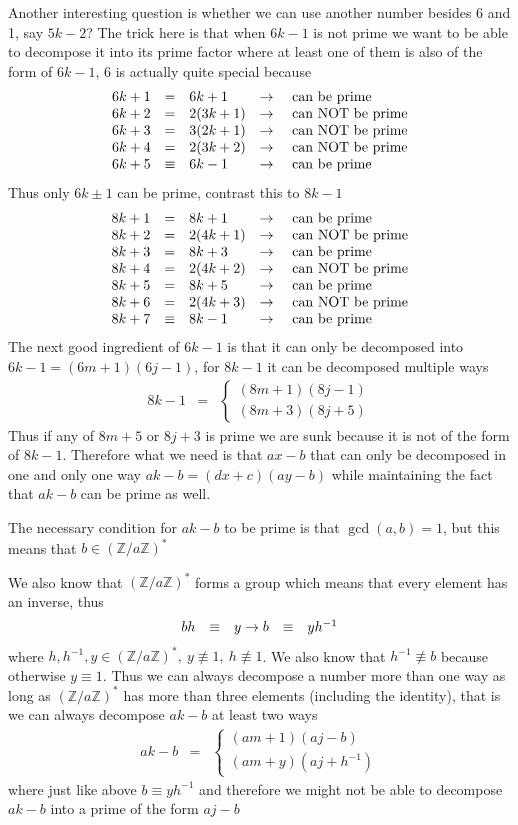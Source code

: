 \documentclass[aps,preprint,preprintnumbers,nofootinbib,showpacs,prd]{revtex4-1}
\newcommand{\ba}{\begin{array}}
\newcommand{\ea}{\end{array}}
\newcommand{\nbea}{\begin{eqnarray*}}
\newcommand{\neea}{\end{eqnarray*}}
\begin{document}
Another interesting question is whether we can use another number besides 6 and 1, say $5k - 2$? The trick here is that when $6k-1$ is not prime we want to be able to decompose it into its prime factor where at least one of them is also of the form of $6k - 1$, 6 is actually quite special because
%
\nbea
\ba{r c l c l}
6k + 1 & = & 6k + 1 & \to & {\rm~can~be~prime} \\
6k + 2 & = & 2(3k + 1) & \to & {\rm~can~NOT~be~prime} \\
6k + 3 & = & 3(2k + 1) & \to & {\rm~can~NOT~be~prime} \\
6k + 4 & = & 2(3k + 2) & \to & {\rm~can~NOT~be~prime} \\
6k + 5 & \equiv & 6k - 1 & \to & {\rm~can~be~prime}
\ea
\neea
%
Thus only $6k \pm 1$ can be prime, contrast this to $8k - 1$
%
\nbea
\ba{r c l c l}
8k + 1 & = & 8k + 1 & \to & {\rm~can~be~prime} \\
8k + 2 & = & 2(4k + 1) & \to & {\rm~can~NOT~be~prime} \\
8k + 3 & = & 8k + 3 & \to & {\rm~can~be~prime} \\
8k + 4 & = & 2(4k + 2) & \to & {\rm~can~NOT~be~prime} \\
8k + 5 & = & 8k + 5 & \to & {\rm~can~be~prime} \\
8k + 6 & = & 2(4k + 3) & \to & {\rm~can~NOT~be~prime} \\
8k + 7 & \equiv & 8k - 1 & \to & {\rm~can~be~prime}
\ea
\neea
%
The next good ingredient of $6k - 1$ is that it can only be decomposed into $6k - 1 = (6m + 1)(6j - 1)$, for $8k - 1$ it can be decomposed multiple ways
%
\nbea
8k - 1 & = & \left \{
\ba{l}
(8m + 1)(8j - 1)\\
(8m + 3)(8j + 5)
\ea
\right.
\neea
%
Thus if any of $8m + 5$ or $8j + 3$ is prime we are sunk because it is not of the form of $8k - 1$. Therefore what we need is that $ax - b$ that can only be decomposed in one and only one way $ak - b = (dx + c)(ay - b)$ while maintaining the fact that $ak - b$ can be prime as well.

The necessary condition for $ak - b$ to be prime is that $\gcd(a,b) = 1$, but this means that $b \in (\mathbb{Z}/a\mathbb{Z})^*$

We also know that $(\mathbb{Z}/a\mathbb{Z})^*$ forms a group which means that every element has an inverse, thus
%
\nbea
\ba{r c l c r c l}
bh & \equiv & y \to b & \equiv & y h^{-1}
\ea
\neea
%
where $h, h^{-1}, y \in (\mathbb{Z}/a\mathbb{Z})^*, ~ y \not\equiv 1, ~ h \not\equiv 1$. We also know that $h^{-1} \not\equiv b$ because otherwise $y \equiv 1$. Thus we can always decompose a number more than one way as long as $(\mathbb{Z}/a\mathbb{Z})^*$ has more than three elements (including the identity), that is we can always decompose $ak - b$ at least two ways
%
\nbea
ak - b & = & \left \{
\ba{l}
(am + 1)(aj - b)\\
(am + y)(aj + h^{-1})
\ea
\right.
\neea
%
where just like above $b \equiv yh^{-1}$ and therefore we might not be able to decompose $ak - b$ into a prime of the form $aj - b$
\end{document}

